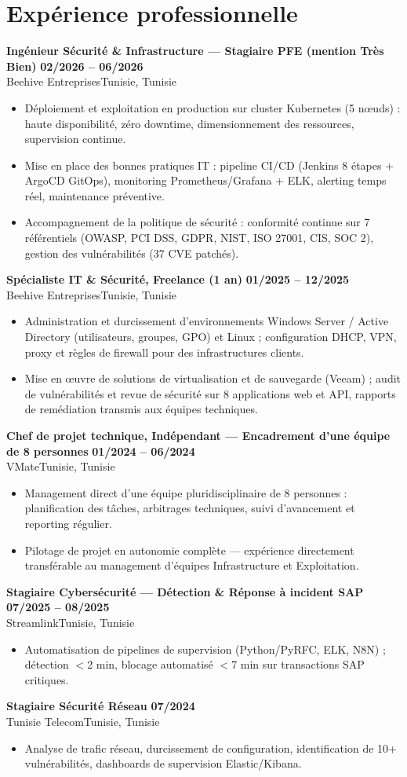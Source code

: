 \documentclass[a4paper,9pt]{article}
\newcommand{\cventry}[4]{\textbf{#1} \hfill \textbf{#4}\\[0.2pt]#2{\ifx\relax#3\relax\else, #3\fi}\par\vspace{0.3pt}}
\begin{document}
\section{Expérience professionnelle}
\cventry{Ingénieur Sécurité \& Infrastructure --- Stagiaire PFE (mention Très Bien)}{Beehive Entreprises}{Tunisie}{02/2026 -- 06/2026}
\begin{itemize}
  \item Déploiement et exploitation en production sur cluster Kubernetes (5 nœuds) : haute disponibilité, zéro downtime, dimensionnement des ressources, supervision continue.
  \item Mise en place des bonnes pratiques IT : pipeline CI/CD (Jenkins 8 étapes + ArgoCD GitOps), monitoring Prometheus/Grafana + ELK, alerting temps réel, maintenance préventive.
  \item Accompagnement de la politique de sécurité : conformité continue sur 7 référentiels (OWASP, PCI DSS, GDPR, NIST, ISO 27001, CIS, SOC 2), gestion des vulnérabilités (37 CVE patchés).
\end{itemize}
\cventry{Spécialiste IT \& Sécurité, Freelance (1 an)}{Beehive Entreprises}{Tunisie}{01/2025 -- 12/2025}
\begin{itemize}
  \item Administration et durcissement d'environnements Windows Server / Active Directory (utilisateurs, groupes, GPO) et Linux ; configuration DHCP, VPN, proxy et règles de firewall pour des infrastructures clients.
  \item Mise en œuvre de solutions de virtualisation et de sauvegarde (Veeam) ; audit de vulnérabilités et revue de sécurité sur 8 applications web et API, rapports de remédiation transmis aux équipes techniques.
\end{itemize}
\cventry{Chef de projet technique, Indépendant --- Encadrement d'une équipe de 8 personnes}{VMate}{Tunisie}{01/2024 -- 06/2024}
\begin{itemize}
  \item Management direct d'une équipe pluridisciplinaire de 8 personnes : planification des tâches, arbitrages techniques, suivi d'avancement et reporting régulier.
  \item Pilotage de projet en autonomie complète --- expérience directement transférable au management d'équipes Infrastructure et Exploitation.
\end{itemize}
\cventry{Stagiaire Cybersécurité --- Détection \& Réponse à incident SAP}{Streamlink}{Tunisie}{07/2025 -- 08/2025}
\begin{itemize}
  \item Automatisation de pipelines de supervision (Python/PyRFC, ELK, N8N) ; détection $<$2 min, blocage automatisé $<$7 min sur transactions SAP critiques.
\end{itemize}
\cventry{Stagiaire Sécurité Réseau}{Tunisie Telecom}{Tunisie}{07/2024}
\begin{itemize}
  \item Analyse de trafic réseau, durcissement de configuration, identification de 10+ vulnérabilités, dashboards de supervision Elastic/Kibana.
\end{itemize}
\end{document}
